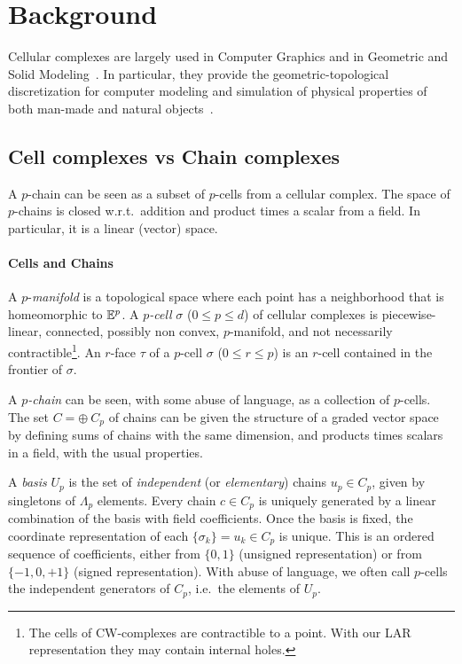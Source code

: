 \section{Background}\label{sec:background}

Cellular complexes are largely used in Computer Graphics and in Geometric and Solid Modeling~\cite{Elter:10.1007/978-3-642-78114-8_12}. In particular, they provide the geometric-topological discretization for computer modeling and simulation of physical properties of both man-made and natural objects~\cite{DiCarlo:2009:DPU:1629255.1629273,ieee-tase}.

\subsection{Cell complexes vs Chain complexes}
\label{cell-complexes-vs-chain-complexes}

A \(p\)-chain can be seen as a subset of \(p\)-cells from a cellular
complex. The space of \(p\)-chains is closed
w.r.t.~addition and product times a scalar from a field. In particular, it is a linear (vector) space.

\paragraph{Cells and Chains}\label{sec:chain}
A $p$-\emph{manifold} is a topological space where each point has a neighborhood
that is homeomorphic to $\mathbb{E}^p$. A \emph{$p$-cell} $\sigma$ ($0\leq p\leq d$) of cellular complexes is piecewise-linear, connected, possibly non convex, $p$-manifold, and not necessarily contractible\footnote{The cells of CW-complexes are contractible to a point. With our LAR representation they may contain internal holes.}. An
$r$-face $\tau$ of a $p$-cell $\sigma$ ($0\leq r\leq p$) is an $r$-cell contained
in the frontier of $\sigma$.


A \emph{$p$-chain} can be seen, with some abuse of language, as a collection of $p$-cells.
The set $C=\oplus\ C_p$ of chains can be given the structure of a graded vector space  by
defining sums of chains with the same dimension, and products times scalars in a
field, with the usual properties.

A \emph{basis} $U_p$  is the set of \emph{independent} (or \emph{elementary}) chains $u_p \in C_p$, given
by singletons of $\Lambda_p$ elements. Every chain $c\in C_p$ is uniquely generated by
a linear combination of the basis with field coefficients. Once  the  basis is fixed, the coordinate
representation of each $\{\sigma_k\} = u_k \in C_p$ is unique. This is an ordered
sequence of coefficients, either from $\{0,1\}$ (unsigned representation) or from
$\{-1,0,+1\}$ (signed representation). With abuse of language, we
often call $p$-cells the independent generators of $C_p$, {i.e.}~the elements of
$U_p$.



